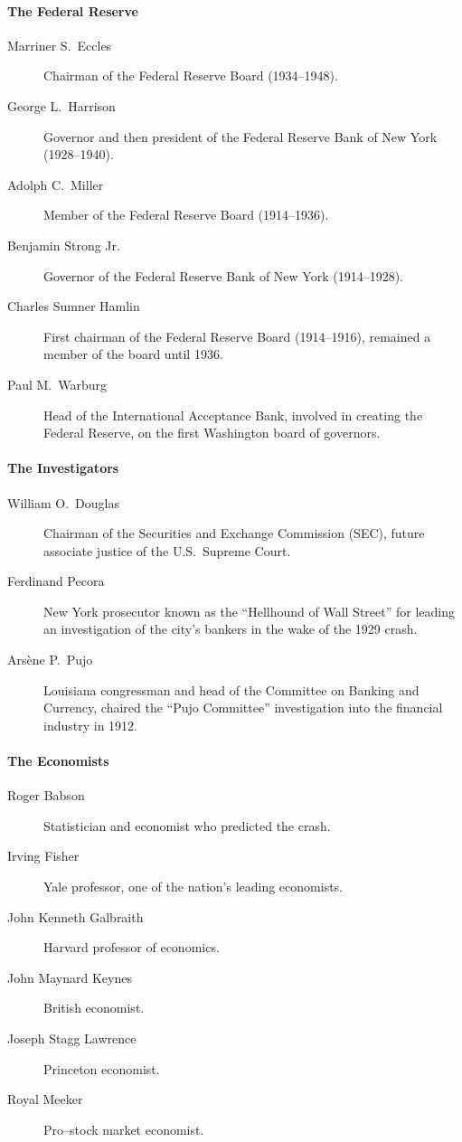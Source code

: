 \documentclass[11pt]{article}
\begin{document}
\paragraph{The Federal Reserve}
\begin{description}
\item[Marriner S.\ Eccles] Chairman of the Federal Reserve Board
(1934--1948).
\item[George L.\ Harrison] Governor and then president of the Federal
Reserve Bank of New York (1928--1940).
\item[Adolph C.\ Miller] Member of the Federal Reserve Board (1914--1936).
\item[Benjamin Strong Jr.] Governor of the Federal Reserve Bank of New York
(1914--1928).
\item[Charles Sumner Hamlin] First chairman of the Federal Reserve Board
(1914--1916), remained a member of the board until 1936.
\item[Paul M.\ Warburg] Head of the International Acceptance Bank, involved
in creating the Federal Reserve, on the first Washington board of governors.
\end{description}

\paragraph{The Investigators}
\begin{description}
\item[William O.\ Douglas] Chairman of the Securities and Exchange
Commission (SEC), future associate justice of the U.S.\ Supreme Court.
\item[Ferdinand Pecora] New York prosecutor known as the ``Hellhound of Wall
Street'' for leading an investigation of the city's bankers in the wake of
the 1929 crash.
\item[Ars\`ene P.\ Pujo] Louisiana congressman and head of the Committee on
Banking and Currency, chaired the ``Pujo Committee'' investigation into the
financial industry in 1912.
\end{description}

\paragraph{The Economists}
\begin{description}
\item[Roger Babson] Statistician and economist who predicted the crash.
\item[Irving Fisher] Yale professor, one of the nation's leading economists.
\item[John Kenneth Galbraith] Harvard professor of economics.
\item[John Maynard Keynes] British economist.
\item[Joseph Stagg Lawrence] Princeton economist.
\item[Royal Meeker] Pro--stock market economist.
\end{description}
\end{document}
